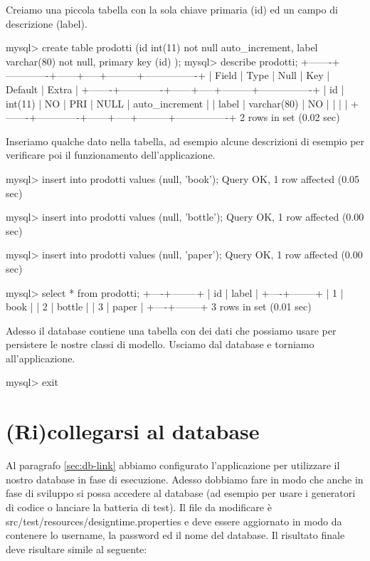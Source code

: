 Creiamo una piccola tabella con la sola chiave primaria (id) ed un campo di descrizione (label).

\begin{bash}
mysql> create table prodotti (id int(11) not null auto_increment, label varchar(80) not null, primary key (id) );
mysql> describe prodotti;
+-------+-------------+------+-----+---------+----------------+
| Field | Type        | Null | Key | Default | Extra          |
+-------+-------------+------+-----+---------+----------------+
| id    | int(11)     | NO   | PRI | NULL    | auto_increment | 
| label | varchar(80) | NO   |     |         |                | 
+-------+-------------+------+-----+---------+----------------+
2 rows in set (0.02 sec)
\end{bash}

Inseriamo qualche dato nella tabella, ad esempio alcune descrizioni di esempio per verificare poi il funzionamento dell'applicazione.

\begin{bash}
mysql> insert into prodotti values (null, 'book');
Query OK, 1 row affected (0.05 sec)

mysql> insert into prodotti values (null, 'bottle');
Query OK, 1 row affected (0.00 sec)

mysql> insert into prodotti values (null, 'paper');
Query OK, 1 row affected (0.00 sec)

mysql> select * from prodotti;
+----+--------+
| id | label  |
+----+--------+
|  1 | book   | 
|  2 | bottle | 
|  3 | paper  | 
+----+--------+
3 rows in set (0.01 sec)
\end{bash}

Adesso il database contiene una tabella con dei dati che possiamo usare per persistere le nostre classi di modello. Usciamo dal database e torniamo all'applicazione.

\begin{bash}
mysql> exit
\end{bash}

\section{(Ri)collegarsi al database}
Al paragrafo \vref{sec:db-link} abbiamo configurato l'applicazione per utilizzare il nostro database in fase di esecuzione. Adesso dobbiamo fare in modo che anche in fase di sviluppo si possa accedere al database (ad esempio per usare i generatori di codice o lanciare la batteria di test). Il file da modificare è src/test/resources/designtime.properties e deve essere aggiornato in modo da contenere lo username, la password ed il nome del database. Il risultato finale deve risultare simile al seguente:

